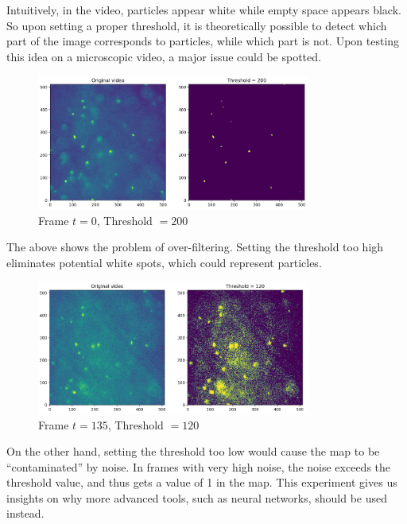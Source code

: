 \documentclass[11pt,a4paper]{scrartcl}
\begin{document}
Intuitively, in the video, particles appear white while empty space appears black. So upon setting a proper threshold, it is theoretically possible to detect which part of the image corresponds to particles, while which part is not. Upon testing this idea on a microscopic video, a major issue could be spotted.

\begin{figure}[h]
    \begin{center}
        \includegraphics[width = 0.8\textwidth]{img/data200_t0.png}
    \end{center}
    \caption{Frame $t = 0$, Threshold $= 200$}
\end{figure}

The above shows the problem of over-filtering. Setting the threshold too high eliminates potential white spots, which could represent particles.

\begin{figure}[h]
    \begin{center}
        \includegraphics[width = 0.8\textwidth]{img/data120_t135.png}
    \end{center}
    \caption{Frame $t = 135$, Threshold $= 120$}
\end{figure}
 
On the other hand, setting the threshold too low would cause the map to be ``contaminated'' by noise. In frames with very high noise, the noise exceeds the threshold value, and thus gets a value of 1 in the map. This experiment gives us insights on why more advanced tools, such as neural networks, should be used instead.
\end{document}
